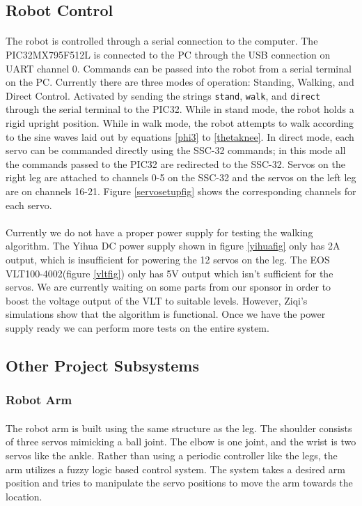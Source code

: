 \documentclass[titlepage,letterpaper,12pt]{article}
\begin{document}
\subsection{Robot Control}
\paragraph{}The robot is controlled through a serial connection to the computer.
The PIC32MX795F512L is connected to the PC through the USB connection on UART
channel 0. Commands can be passed into the robot from a serial terminal on the
PC. Currently there are three modes of operation: Standing, Walking, and Direct
Control. Activated by sending the strings \verb!stand!, \verb!walk!, and
\verb!direct! through the serial terminal to the PIC32. While in stand mode, the
robot holds a rigid upright position. While in walk mode, the robot attempts to
walk according to the sine waves laid out by equations \ref{phi3} to
\ref{thetaknee}. In direct mode, each servo can be commanded directly using
the SSC-32 commands; in this mode all the commands passed to the PIC32 are
redirected to the SSC-32. Servos on the right leg are attached to channels 0-5
on the SSC-32 and the servos on the left leg are on channels 16-21. Figure
\ref{servosetupfig} shows the corresponding channels for each servo.

\paragraph{}Currently we do not have a proper power supply for testing the
walking algorithm. The Yihua DC power supply shown in figure \ref{yihuafig} only
has 2A output, which is insufficient for powering the 12 servos on the leg. The
EOS VLT100-4002(figure \ref{vltfig}) only has 5V output which isn't sufficient
for the servos. We are currently waiting on some parts from our sponsor in order
to boost the voltage output of the VLT to suitable levels. However, Ziqi's
simulations show that the algorithm is functional. Once we have the power supply
ready we can perform more tests on the entire system.

\subsection{Other Project Subsystems}
\subsubsection{Robot Arm}
\paragraph{}The robot arm is built using the same structure as the leg. The
shoulder consists of three servos mimicking a ball joint. The elbow is one
joint, and the wrist is two servos like the ankle. Rather than using a periodic
controller like the legs, the arm utilizes a fuzzy logic based control system.
The system takes a desired arm position and tries to manipulate the servo
positions to move the arm towards the location.
\end{document}
